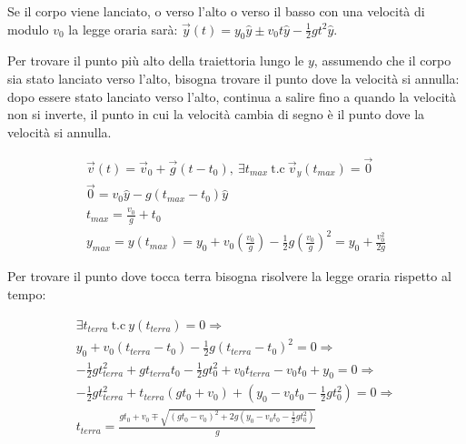 \documentclass{article}
\numberwithin{equation}{subsection}
\begin{document}
Se il corpo viene lanciato, o verso l'alto o verso il basso
con una velocità di modulo $v_0$ la legge oraria sarà: 
$\vec y(t) = y_0\hat{y} \pm v_0t\hat{y}-\displaystyle\frac{1}{2}gt^{2}\hat{y}$.

\begin{center}\end{center}

Per trovare il punto più alto della traiettoria lungo le $y$,
assumendo che il corpo sia stato lanciato verso l'alto, bisogna
trovare il punto dove la velocità si annulla: dopo essere stato 
lanciato verso l'alto, continua a salire fino a quando la 
velocità non si inverte, il punto in cui la velocità cambia di 
segno è il punto dove la velocità si annulla.

\begin{gather}
    \vec{v}(t) = \vec{v}_0  + \vec{g}(t-t_0),\:\exists t_{max} \:\mbox{t.c}\:\vec{v}_y(t_{max}) = \vec{0}\\
    \vec0= v_0\hat{y} - g(t_{max}-t_0)\hat{y}\\
    t_{max} = \displaystyle\frac{v_0}{g} + t_0\\
    y_{max} = y(t_{max}) = y_0 + v_0\left(\displaystyle\frac{v_0}{g}\right) -
    \displaystyle\frac{1}{2}g\left(\displaystyle\frac{v_0}{g}\right)^{2} =
    y_0 + \displaystyle\frac{v_0^{2}}{2g}
\end{gather}

Per trovare il punto dove tocca terra bisogna risolvere 
la legge oraria rispetto al tempo:

\begin{gather}
    \exists t_{terra}\:\mbox{t.c}\: y(t_{terra}) = 0\Rightarrow\\
    y_0 + v_0(t_{terra} - t_0)-\displaystyle\frac{1}{2}g
    (t_{terra} - t_0)^{2} = 0\Rightarrow\\
    -\displaystyle\frac{1}{2}gt_{terra}^{2} + gt_{terra}t_0
    -\displaystyle\frac{1}{2}gt_0^{2}+v_0t_{terra} - v_0t_0 +y_0 =0\Rightarrow\\
    -\displaystyle\frac{1}{2}gt_{terra}^{2}+t_{terra}
    (gt_0+v_0) + \left(y_0-v_0t_0 
    -\displaystyle\frac{1}{2}gt_0^{2}\right)=0\Rightarrow\\
    t_{terra} = \displaystyle\frac{gt_0+v_0 \mp\sqrt{(gt_0-v_0)^{2}+2g\left(y_0-v_0t_0-\displaystyle\frac{1}{2}gt_0^{2}\right)}}{g}
\end{gather}
\end{document}
